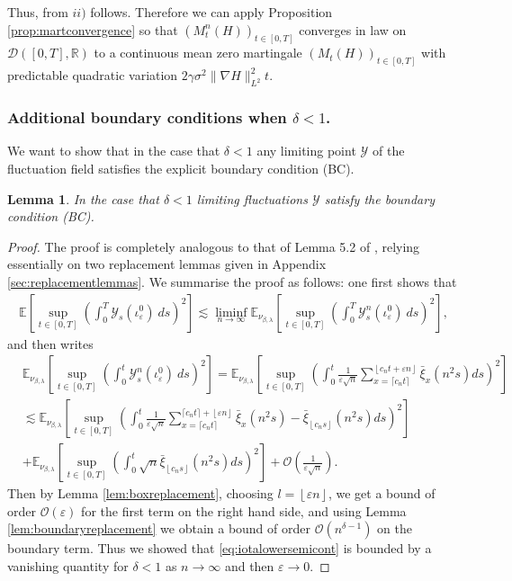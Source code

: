 \documentclass[a4paper, reqno, 12pt]{amsart}
\theoremstyle{plain}
\newtheorem{lemma}[definition]{Lemma}
\theoremstyle{definition}
\newcommand{\floor}[1]{\left\lfloor #1 \right\rfloor}
\newcommand{\ee}[1]{\mathbb{E}_{\nu_{\beta,\lambda}}\left[ #1 \right]}
\newcommand{\R}{\mathbb{R}}
\begin{document}
Thus, from $ii)$ follows.
Therefore we can apply Proposition \ref{prop:martconvergence} so that $(M^n_t(H))_{t\in[0,T]}$ converges in law on $\mathcal{D}([0,T],\R)$ to a continuous mean zero martingale $(M_t(H))_{t\in[0,T]}$ with predictable quadratic variation $2\gamma \sigma^2 \|\nabla H\|_{L^2}^2 t$.  


\subsubsection{Additional boundary conditions when $\delta<1$.}
\label{subsubsec:BC}
We want to show that in the case that $\delta<1$ any limiting point $\mathcal Y$ of the fluctuation field satisfies the explicit boundary condition (BC).

\begin{lemma}
    In the case that $\delta < 1$ limiting fluctuations $\mathcal Y$ satisfy the boundary condition {(BC)}.
\end{lemma}
\begin{proof}
    The proof is completely analogous to that of Lemma 5.2 of \cite{BGJS22}, relying essentially on two replacement lemmas given in Appendix \ref{sec:replacementlemmas}. We summarise the proof as follows: one first shows that
    \begin{align} \label{eq:iotalowersemicont}
        \mathbb E\left[\sup_{t\in[0,T]}\left( \int_0^T \mathcal Y_s(\iota^0_{\varepsilon})\ ds\right)^2\right] \lesssim \liminf_{n\to\infty} \ee{\sup_{t\in[0,T]}\left( \int_0^T \mathcal Y_s^n(\iota^0_{\varepsilon})\ ds\right)^2},
    \end{align}
    and then writes 
    \begin{align*}
        &\ee{\sup_{t\in[0,T]} \left(\int_0^t \mathcal{Y}^n_s(\iota_{\varepsilon}^0)\ ds \right)^2}= \ee{\sup_{t\in[0,T]} \left(\int_0^t \frac{1}{\varepsilon\sqrt{n}}\sum_{x=\lceil c_nt\rceil}^{\floor{c_nt+\varepsilon n}} \bar{\xi}_x(n^2s) ds\right)^2}\\
        & \lesssim \ee{\sup_{t\in[0,T]} \left( \int_0^t \frac{1}{\varepsilon \sqrt{n}} \sum_{x=\lceil c_nt\rceil}^{\lceil c_nt\rceil +\floor{\varepsilon n}}\bar \xi_x(n^2s) -\bar{\xi}_{\floor{c_ns}}(n^2s) ds\right)^2 } \\
        & + \ee{\sup_{t\in[0,T]}\left(\int_0^t \sqrt{n}\bar{\xi}_{\floor{c_ns}}(n^2s) ds\right)^2} +\mathcal O\left(\frac{1}{\varepsilon \sqrt{n}}\right).
    \end{align*}
    Then by Lemma \ref{lem:boxreplacement}, choosing $l = \floor{\varepsilon n}$, we get a bound of order $\mathcal O(\varepsilon)$ for the first term on the right hand side, and using Lemma \ref{lem:boundaryreplacement} we obtain a bound of order $\mathcal O(n^{\delta-1})$ on the boundary term. Thus we showed that \eqref{eq:iotalowersemicont} is bounded by a vanishing quantity for $\delta<1$ as $n\to\infty$ and then $\varepsilon\to 0$.
\end{proof}
\end{document}
